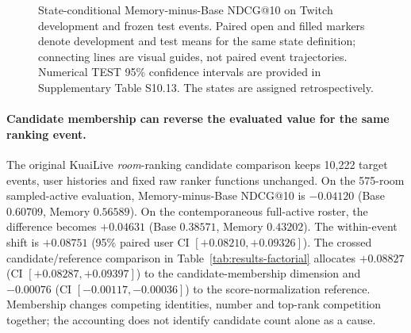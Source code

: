 \begin{figure}[!htbp]
\centering
{}
\caption{State-conditional Memory-minus-Base NDCG@10 on Twitch development and frozen test events. Paired open and filled markers denote development and test means for the same state definition; connecting lines are visual guides, not paired event trajectories. Numerical TEST 95\% confidence intervals are provided in Supplementary Table S10.13. The states are assigned retrospectively.}
\label{fig:results-evidence-states}
\end{figure}

\paragraph{Candidate membership can reverse the evaluated value for the same ranking event.}
The original KuaiLive \emph{room}-ranking candidate comparison keeps 10,222 target events, user histories and fixed raw ranker functions unchanged. On the 575-room sampled-active evaluation, Memory-minus-Base NDCG@10 is $-0.04120$ (Base $0.60709$, Memory $0.56589$). On the contemporaneous full-active roster, the difference becomes $+0.04631$ (Base $0.38571$, Memory $0.43202$). The within-event shift is $+0.08751$ (95\% paired user CI $[+0.08210,+0.09326]$). The crossed candidate/reference comparison in Table~\ref{tab:results-factorial} allocates $+0.08827$ (CI $[+0.08287,+0.09397]$) to the candidate-membership dimension and $-0.00076$ (CI $[-0.00117,-0.00036]$) to the score-normalization reference. Membership changes competing identities, number and top-rank competition together; the accounting does not identify candidate count alone as a cause.

